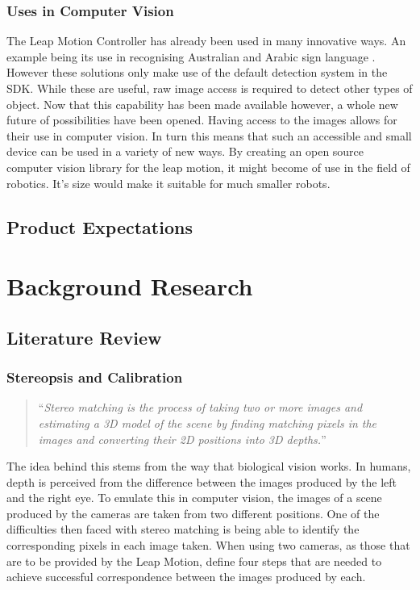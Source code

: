 \documentclass[11pt,oneside]{report}
\begin{document}
			\subsection{Uses in Computer Vision}
				The Leap Motion Controller has already been used in many innovative ways.
				An example being its use in recognising Australian and Arabic sign language \cite{journal:leapSignLanguage,journal:leapSignLanguage2}.
				However these solutions only make use of the default detection system in the SDK.
				While these are useful, raw image access is required to detect other types of object.
				Now that this capability has been made available however, a whole new future of possibilities have been opened.
				Having access to the images allows for their use in computer vision.
				In turn this means that such an accessible and small device can be used in a variety of new ways.
				By creating an open source computer vision library for the leap motion, it might become of use in the field of robotics.
				It's size would make it suitable for much smaller robots.
				
		\section{Product Expectations}
		
	\chapter{Background Research}
		\section{Literature Review}
			\subsection{Stereopsis and Calibration}
			\begin{quote}
				``\textit{Stereo matching is the process of taking two or more images and estimating a 3D model of the scene by finding matching pixels in the images and converting their 2D positions into 3D depths.}''\cite{book:sam}
			\end{quote}
			The idea behind this stems from the way that biological vision works.
			In humans, depth is perceived from the difference between the images produced by the left and the right eye.
			To emulate this in computer vision, the images of a scene produced by the cameras are taken from two different positions.
			One of the difficulties then faced with stereo matching is being able to identify the corresponding pixels in each image taken.
			When using two cameras, as those that are to be provided by the Leap Motion,  define four steps that are needed to achieve successful correspondence between the images produced by each.
			
\end{document}
